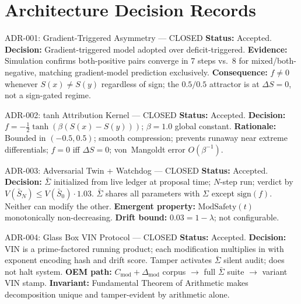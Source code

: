 \documentclass[12pt,letterpaper]{article}
\begin{document}
\section{Architecture Decision Records}\label{sec:adrs}

\begin{adrnote}{ADR-001: Gradient-Triggered Asymmetry --- CLOSED}
\textbf{Status:} Accepted.
\textbf{Decision:} Gradient-triggered model adopted over deficit-triggered.
\textbf{Evidence:} Simulation confirms both-positive pairs converge in 7 steps
vs.\ 8 for mixed/both-negative, matching gradient-model prediction exclusively.
\textbf{Consequence:} $f\neq 0$ whenever $S(x)\neq S(y)$ regardless of sign;
the $0.5/0.5$ attractor is at $\Delta S=0$, not a sign-gated regime.
\end{adrnote}

\begin{adrnote}{ADR-002: tanh Attribution Kernel --- CLOSED}
\textbf{Status:} Accepted.
\textbf{Decision:} $f=-\tfrac{1}{2}\tanh(\beta(S(x)-S(y)))$; $\beta=1.0$ global constant.
\textbf{Rationale:} Bounded in $(-0.5,0.5)$; smooth compression; prevents runaway
near extreme differentials; $f=0$ iff $\Delta S=0$; von~Mangoldt error $O(\beta^{-1})$.
\end{adrnote}

\begin{adrnote}{ADR-003: Adversarial Twin + Watchdog --- CLOSED}
\textbf{Status:} Accepted.
\textbf{Decision:} $\bar\Sigma$ initialized from live ledger at proposal time;
$N$-step run; verdict by $V(\bar S_N)\leq V(\bar S_0)\cdot 1.03$.
$\bar\Sigma$ shares all parameters with $\Sigma$ except $\mathrm{sign}(f)$.
Neither can modify the other.
\textbf{Emergent property:} $\mathrm{ModSafety}(t)$ monotonically non-decreasing.
\textbf{Drift bound:} $0.03=1-\lambda$; not configurable.
\end{adrnote}

\begin{adrnote}{ADR-004: Glass Box VIN Protocol --- CLOSED}
\textbf{Status:} Accepted.
\textbf{Decision:} VIN is a prime-factored running product; each modification multiplies
in with exponent encoding hash and drift score.
Tamper activates $\bar\Sigma$ silent audit; does not halt system.
\textbf{OEM path:} $C_{\mathrm{mod}}+\Delta_{\mathrm{mod}}$ corpus $\to$ full $\bar\Sigma$ suite $\to$
variant VIN stamp.
\textbf{Invariant:} Fundamental Theorem of Arithmetic makes decomposition unique and
tamper-evident by arithmetic alone.
\end{adrnote}
\end{document}
